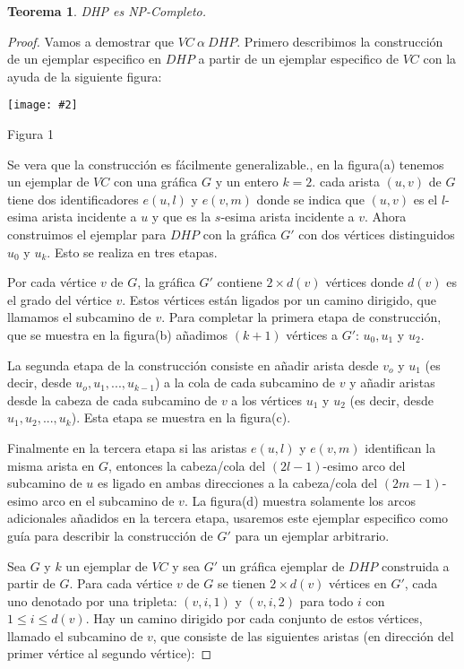 \documentclass{article}
\newtheorem{theorem}{Teorema}
\newcommand{\jcimage}[2]{\begin{center}\texttt{[image: \#2]}\end{center}\vskip10pt}
\begin{document}
\begin{theorem}
  DHP es NP-Completo.
\end{theorem}
\begin{proof}
  Vamos a demostrar que $VC\ \alpha\ DHP$. Primero describimos la construcción de un ejemplar especifico en $DHP$ a partir de un ejemplar especifico de $VC$ con la ayuda de la siguiente figura:

  \jcimage{0.7}{figura-dhp.jpg}{Figura 1}

  Se vera que la construcción es fácilmente generalizable., en la figura(a) tenemos un ejemplar de $VC$ con una gráfica $G$ y un entero $k = 2$. cada arista $(u,v)$ de $G$ tiene dos identificadores $e(u,l)$ y $e(v,m)$ donde se indica que $(u,v)$ es el $l$-esima arista incidente a $u$ y que es la $s$-esima arista incidente a $v$. Ahora construimos el ejemplar para $DHP$ con la gráfica $G'$ con dos vértices distinguidos $u_0$ y $u_k$. Esto se realiza en tres etapas.

  Por cada vértice $v$ de $G$, la gráfica $G'$ contiene $2 \times d(v)$ vértices donde $d(v)$ es el grado del vértice $v$. Estos vértices están ligados por un camino dirigido, que llamamos el subcamino de $v$. Para completar la primera etapa de construcción, que se muestra en la figura(b) añadimos $(k + 1)$ vértices a $G'$: $u_0, u_1$ y $u_2$.

  La segunda etapa de la construcción consiste en añadir arista desde $v_o$ y $u_1$ (es decir, desde $u_o,u_1, ..., u_{k-1}$) a la cola de cada subcamino de $v$ y añadir aristas desde la cabeza de cada subcamino de $v$ a los vértices $u_1$ y $u_2$ (es decir, desde $u_1,u_2, ..., u_k$). Esta etapa se muestra en la figura(c).

  Finalmente en la tercera etapa si las aristas $e(u,l)$ y $e(v,m)$ identifican la misma arista en $G$, entonces la cabeza/cola del $(2l-1)$-esimo arco del subcamino de $u$ es ligado en ambas direcciones a la cabeza/cola  del $(2m-1)$-esimo arco en el subcamino de $v$. La figura(d) muestra solamente los arcos adicionales añadidos en la tercera etapa, usaremos este ejemplar especifico como guía para describir la construcción de $G'$ para un ejemplar arbitrario.

  Sea $G$ y $k$ un ejemplar de $VC$ y sea $G'$ un gráfica ejemplar de $DHP$ construida a partir de $G$. Para cada vértice $v$ de $G$ se tienen $2 \times d(v)$ vértices en $G'$, cada uno denotado por una tripleta: $(v, i, 1)$ y $(v, i, 2)$ para todo $i$ con $1 \leqslant i \leqslant d(v)$. Hay un camino dirigido por cada conjunto de estos vértices, llamado el subcamino de $v$, que consiste de las siguientes aristas (en dirección del primer vértice al segundo vértice):


\end{proof}
\end{document}
